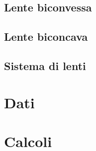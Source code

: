 \documentclass[a4paper]{article}
\begin{document}
    \subsection{Lente biconvessa}
    \subsection{Lente biconcava}
    \subsection{Sistema di lenti}
\begin{appendices}
    \section{Dati}
    \section{Calcoli}
\end{appendices}
\end{document}
